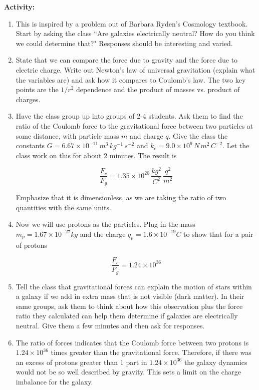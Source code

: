 \documentclass{article}
\begin{document}
\textbf{Activity:}
\begin{enumerate}
\item This is inspired by a problem out of Barbara Ryden's Cosmology textbook. Start by asking the class ``Are galaxies electrically neutral? How do you think we could determine that?" Responses should be interesting and varied.

\item State that we can compare the force due to gravity and the force due to electric charge. Write out Newton's law of universal gravitation (explain what the variables are) and ask how it compares to Coulomb's law. The two key points are the $1/r^2$ dependence and the product of masses vs. product of charges.

\item Have the class group up into groups of 2-4 students. Ask them to find the ratio of the Coulomb force to the gravitational force between two particles at some distance, with particle mass $m$ and charge $q$. Give the class the constants $G = 6.67 \times 10^{-11} \, m^3 \, kg^{-1} \, s^{-2}$ and $k_e = 9.0 \times 10^9 \, N \, m^2 \, C^{-2}$. Let the class work on this for about 2 minutes. The result is

\begin{equation}
	\frac{F_c}{F_g} = 1.35 \times 10^{20} \, \frac{kg^2}{C^2} \, \frac{q^2}{m^2}
\end{equation}

Emphasize that it is dimensionless, as we are taking the ratio of two quantities with the same units.

\item Now we will use protons as the particles. Plug in the mass $m_p = 1.67 \times 10^{-27} kg$ and the charge $q_p = 1.6 \times 10^{-19} C$ to show that for a pair of protons

\begin{equation}
	\frac{F_c}{F_g} = 1.24 \times 10^{36}
\end{equation}

\item Tell the class that gravitational forces can explain the motion of stars within a galaxy if we add in extra mass that is not visible (dark matter). In their same groups, ask them to think about how this observation plus the force ratio they calculated can help them determine if galaxies are electrically neutral. Give them a few minutes and then ask for responses.

\item The ratio of forces indicates that the Coulomb force between two protons is $1.24 \times 10^{36}$ times greater than the gravitational force. Therefore, if there was an excess of protons greater than 1 part in $1.24 \times 10^{36}$ the galaxy dynamics would not be so well described by gravity. This sets a limit on the charge imbalance for the galaxy. 


\end{enumerate}
\end{document}
